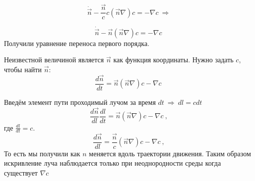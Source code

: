 \documentclass[14pt,a4paper,oneside]{extarticle}	%
\begin{document}
\begin{equation*}
\dot{\vec{n}} -  \frac{\vec{n}}{c}c(\vec{n}\nabla)c = -\nabla c \:\Rightarrow
\end{equation*}
 
\begin{equation*}
\dot{\vec{n}} - \vec{n}(\vec{n}\nabla)c = -\nabla c \:
\end{equation*}
Получили уравнение переноса первого порядка.

Неизвестной величиной является $ \vec{n} $ как функция координаты.
Нужно задать $ c $, чтобы найти $ \vec{n} $:
\begin{equation*}
\frac{d\vec{n}}{dt} = \vec{n}(\vec{n}\nabla)c - \nabla c \:
\end{equation*}

Введём элемент пути проходимый лучом за время $ dt \:\Rightarrow\: dl=cdt $
\begin{equation*}
\frac{d\vec{n}}{dl}\frac{dl}{dt} = \vec{n}(\vec{n}\nabla)c - \nabla c \:,
\end{equation*}
где $ \frac{dl}{dt} = c $.
\begin{equation}\label{66}
\frac{d\vec{n}}{dl} = \frac{\vec{n}}{c}(\vec{n}\nabla)c - \nabla c \:,
\end{equation}
То есть мы получили как $ n $ меняется вдоль траектории движения. 
Таким образом искривление луча наблюдается только при неоднородности среды когда существует $ \nabla c $
\end{document}
